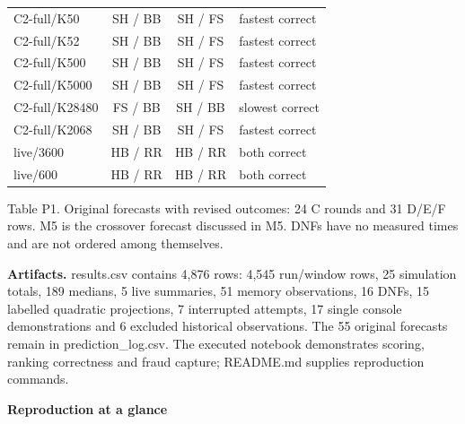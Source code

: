 \documentclass[10pt,a4paper]{article}
\newcommand{\subheading}[1]{%
  \par\addvspace{3pt}%
  \noindent{\color{teal}\rule[-1.4pt]{2.6pt}{9pt}}\hspace{5pt}%
  {\fontsize{9.2}{11}\selectfont\bfseries #1}%
  \par\vspace{1pt}%
}
\newcommand{\figcaption}[1]{%
  \par\vspace{2pt}%
  {\fontsize{6.8}{8.1}\selectfont\color{muted}#1}%
  \par\vspace{2pt}%
}
\begin{document}
\begin{minipage}[t]{0.485\linewidth}
{\begin{tabularx}{\linewidth}{@{}L{1.25}C{0.8}C{0.85}L{1.1}@{}}
C2-full/K50 & SH / BB & SH / FS & fastest correct \\
C2-full/K52 & SH / BB & SH / FS & fastest correct \\
C2-full/K500 & SH / BB & SH / FS & fastest correct \\
C2-full/K5000 & SH / BB & SH / FS & fastest correct \\
C2-full/K28480 & FS / BB & SH / BB & slowest correct \\
C2-full/K2068 & SH / BB & SH / FS & fastest correct \\
live/3600 & HB / RR & HB / RR & both correct \\
live/600 & HB / RR & HB / RR & both correct \\
\bottomrule
\end{tabularx}}
\end{minipage}\par\vspace{1pt}

\figcaption{Table P1. Original forecasts with revised outcomes: 24 C rounds
and 31 D/E/F rows. M5 is the crossover forecast discussed in M5. DNFs have no
measured times and are not ordered among themselves.}

\textbf{Artifacts.} results.csv contains 4,876 rows: 4,545 run/window rows, 25
simulation totals, 189 medians, 5 live summaries, 51 memory observations, 16
DNFs, 15 labelled quadratic projections, 7 interrupted attempts, 17 single
console demonstrations and 6 excluded historical observations. The 55 original
forecasts remain in prediction\_log.csv. The executed notebook demonstrates
scoring, ranking correctness and fraud capture; README.md supplies reproduction
commands.\par

\vspace{4pt}
\subheading{Reproduction at a glance}

\begingroup
\setlength{\fboxsep}{5pt}%
\noindent
{}%
\endgroup\par
\end{document}
